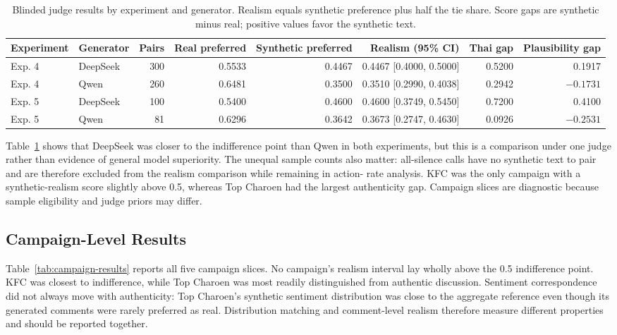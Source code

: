\documentclass[conference]{IEEEtran}
\begin{document}
\begin{table}[t]
\caption{Blinded judge results by experiment and generator. Realism equals
synthetic preference plus half the tie share. Score gaps are synthetic minus
real; positive values favor the synthetic text.}
\label{tab:judge-generator}
\centering
\footnotesize
\begin{tabular}{@{}llrrrrrr@{}}
\toprule
Experiment & Generator & Pairs & Real preferred & Synthetic preferred &
Realism (95\% CI) & Thai gap & Plausibility gap \\
\midrule
Exp. 4 & DeepSeek & 300 & 0.5533 & 0.4467 & 0.4467 [0.4000, 0.5000] & 0.5200 & 0.1917 \\
Exp. 4 & Qwen     & 260 & 0.6481 & 0.3500 & 0.3510 [0.2990, 0.4038] & 0.2942 & $-0.1731$ \\
Exp. 5 & DeepSeek & 100 & 0.5400 & 0.4600 & 0.4600 [0.3749, 0.5450] & 0.7200 & 0.4100 \\
Exp. 5 & Qwen     &  81 & 0.6296 & 0.3642 & 0.3673 [0.2747, 0.4630] & 0.0926 & $-0.2531$ \\
\bottomrule
\end{tabular}
\end{table}

Table~\ref{tab:judge-generator} shows that DeepSeek was closer to the
indifference point than Qwen in both experiments, but this is a comparison
under one judge rather than evidence of general model superiority. The unequal
sample counts also matter: all-silence calls have no synthetic text to pair and
are therefore excluded from the realism comparison while remaining in action-
rate analysis. KFC was the only campaign with a synthetic-realism score
slightly above 0.5, whereas Top Charoen had the largest authenticity gap.
Campaign slices are diagnostic because sample eligibility and judge priors may
differ.

\subsection{Campaign-Level Results}

Table~\ref{tab:campaign-results} reports all five campaign slices. No
campaign's realism interval lay wholly above the 0.5 indifference point. KFC
was closest to indifference, while Top Charoen was most readily distinguished
from authentic discussion. Sentiment correspondence did
not always move with authenticity: Top Charoen's synthetic sentiment
distribution was close to the aggregate reference even though its generated
comments were rarely preferred as real. Distribution matching and
comment-level realism therefore measure different properties and should be
reported together.
\end{document}
